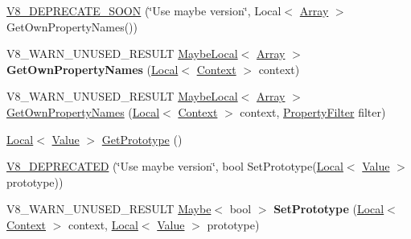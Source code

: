 \begin{DoxyCompactItemize}
\item 
\hyperlink{classv8_1_1_object_aa72e9d0d22d1d4a4c4b63827a5469d40}{V8\+\_\+\+D\+E\+P\+R\+E\+C\+A\+T\+E\+\_\+\+S\+O\+ON} (\char`\"{}Use maybe version\char`\"{}, Local$<$ \hyperlink{classv8_1_1_array}{Array} $>$ Get\+Own\+Property\+Names())
\item 
V8\+\_\+\+W\+A\+R\+N\+\_\+\+U\+N\+U\+S\+E\+D\+\_\+\+R\+E\+S\+U\+LT \hyperlink{classv8_1_1_maybe_local}{Maybe\+Local}$<$ \hyperlink{classv8_1_1_array}{Array} $>$ {\bfseries Get\+Own\+Property\+Names} (\hyperlink{classv8_1_1_local}{Local}$<$ \hyperlink{classv8_1_1_context}{Context} $>$ context)\hypertarget{classv8_1_1_object_a57cb76115bb2e0be18f4b06c6e7f9580}{}\label{classv8_1_1_object_a57cb76115bb2e0be18f4b06c6e7f9580}

\item 
V8\+\_\+\+W\+A\+R\+N\+\_\+\+U\+N\+U\+S\+E\+D\+\_\+\+R\+E\+S\+U\+LT \hyperlink{classv8_1_1_maybe_local}{Maybe\+Local}$<$ \hyperlink{classv8_1_1_array}{Array} $>$ \hyperlink{classv8_1_1_object_a5a37ed2919eea85b16528079c9d21233}{Get\+Own\+Property\+Names} (\hyperlink{classv8_1_1_local}{Local}$<$ \hyperlink{classv8_1_1_context}{Context} $>$ context, \hyperlink{namespacev8_afbf02b6b1152a3e25d7bde90798209ac}{Property\+Filter} filter)
\item 
\hyperlink{classv8_1_1_local}{Local}$<$ \hyperlink{classv8_1_1_value}{Value} $>$ \hyperlink{classv8_1_1_object_a684cd61c13957c5b90c0ea0a50749dd1}{Get\+Prototype} ()
\item 
\hyperlink{classv8_1_1_object_a4ce54e137e22eddbe2857a15a20219b2}{V8\+\_\+\+D\+E\+P\+R\+E\+C\+A\+T\+ED} (\char`\"{}Use maybe version\char`\"{}, bool Set\+Prototype(\hyperlink{classv8_1_1_local}{Local}$<$ \hyperlink{classv8_1_1_value}{Value} $>$ prototype))
\item 
V8\+\_\+\+W\+A\+R\+N\+\_\+\+U\+N\+U\+S\+E\+D\+\_\+\+R\+E\+S\+U\+LT \hyperlink{classv8_1_1_maybe}{Maybe}$<$ bool $>$ {\bfseries Set\+Prototype} (\hyperlink{classv8_1_1_local}{Local}$<$ \hyperlink{classv8_1_1_context}{Context} $>$ context, \hyperlink{classv8_1_1_local}{Local}$<$ \hyperlink{classv8_1_1_value}{Value} $>$ prototype)\hypertarget{classv8_1_1_object_a2254101408ba3c72bc7638bbede1ae60}{}\label{classv8_1_1_object_a2254101408ba3c72bc7638bbede1ae60}


\end{DoxyCompactItemize}
